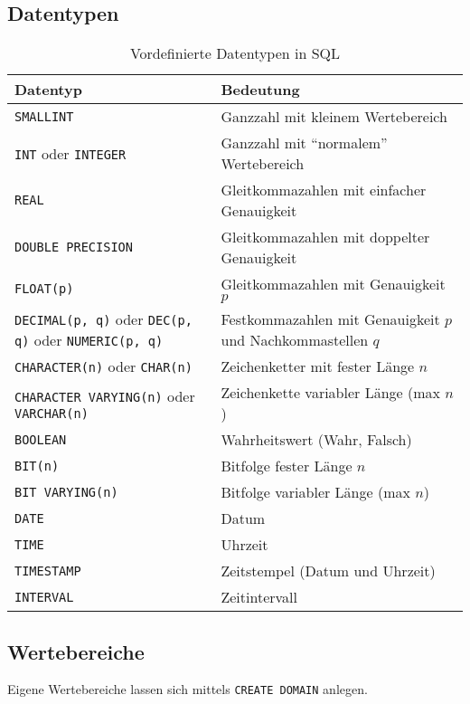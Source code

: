         \subsection{Datentypen} %
            \begin{table}[H]
            	\centering
            	\begin{tabular}{l | l}
            		Datentyp & Bedeutung \\ \hline
            		\lstinline|SMALLINT| & Ganzzahl mit kleinem Wertebereich \\
            		\lstinline|INT| oder \lstinline|INTEGER| & Ganzzahl mit \enquote{normalem} Wertebereich \\
            		\lstinline|REAL| & Gleitkommazahlen mit einfacher Genauigkeit \\
            		\lstinline|DOUBLE PRECISION| & Gleitkommazahlen mit doppelter Genauigkeit \\
            		\lstinline|FLOAT(p)| & Gleitkommazahlen mit Genauigkeit \(p\) \\
            		\lstinline|DECIMAL(p, q)| oder \lstinline|DEC(p, q)| oder \lstinline|NUMERIC(p, q)| & Festkommazahlen mit Genauigkeit \(p\) und Nachkommastellen \(q\) \\
            		\lstinline|CHARACTER(n)| oder \lstinline|CHAR(n)| & Zeichenketter mit fester Länge \(n\) \\
            		\lstinline|CHARACTER VARYING(n)| oder \lstinline|VARCHAR(n)| & Zeichenkette variabler Länge (max \(n\)) \\
            		\lstinline|BOOLEAN| & Wahrheitswert (Wahr, Falsch) \\
            		\lstinline|BIT(n)| & Bitfolge fester Länge \(n\) \\
            		\lstinline|BIT VARYING(n)| & Bitfolge variabler Länge (max \(n\)) \\
            		\lstinline|DATE| & Datum \\
            		\lstinline|TIME| & Uhrzeit \\
            		\lstinline|TIMESTAMP| & Zeitstempel (Datum und Uhrzeit) \\
            		\lstinline|INTERVAL| & Zeitintervall
            	\end{tabular}
            	\caption{Vordefinierte Datentypen in SQL}
            \end{table}

        \subsection{Wertebereiche} %
            Eigene Wertebereiche lassen sich mittels \lstinline|CREATE DOMAIN| anlegen.
            
